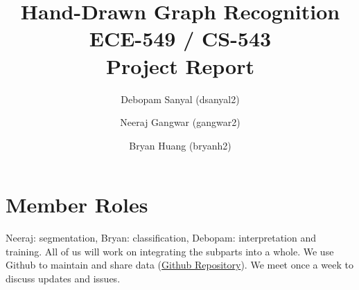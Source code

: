 \documentclass[10pt, twocolumn,letterpaper]{article}
\title{Hand-Drawn Graph Recognition\\
	ECE-549 / CS-543\\
	Project Report}
\author{Debopam Sanyal (dsanyal2) \and Neeraj Gangwar (gangwar2) \and Bryan Huang (bryanh2)}
\begin{document}
	\maketitle
	
	
	
	
	
	
	
	
	
	\section{Member Roles}
	Neeraj: segmentation, Bryan: classification, Debopam: interpretation and training. All of us will work on integrating the subparts into a whole. We use Github to maintain and share data (\href{https://github.com/neerajgangwar/graph-recognition}{Github Repository}). We meet once a week to discuss updates and issues.
	
	\printbibliography[title=References]
	
\end{document}
